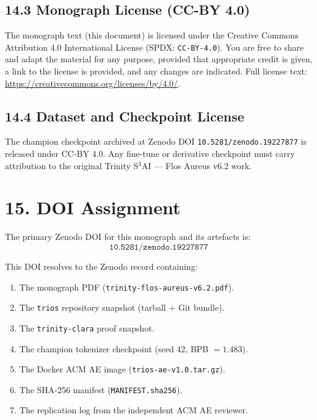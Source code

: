 \subsection{14.3 Monograph License (CC-BY 4.0)}\label{sec:monograph-license}

The monograph text (this document) is licensed under the Creative Commons
Attribution 4.0 International License (SPDX: \texttt{CC-BY-4.0}).
You are free to share and adapt the material for any purpose, provided
that appropriate credit is given, a link to the license is provided, and
any changes are indicated.  Full license text:
\url{https://creativecommons.org/licenses/by/4.0/}.

\subsection{14.4 Dataset and Checkpoint License}\label{sec:data-license}

The champion checkpoint archived at Zenodo DOI
\texttt{10.5281/zenodo.19227877} is released under CC-BY 4.0.  Any
fine-tune or derivative checkpoint must carry attribution to the original
Trinity S${}^3$AI — Flos Aureus v6.2 work.


\section{15. DOI Assignment}\label{sec:doi}

The primary Zenodo DOI for this monograph and its artefacts is:
\[
  \texttt{10.5281/zenodo.19227877}
\]

This DOI resolves to the Zenodo record containing:

\begin{enumerate}
\item The monograph PDF (\texttt{trinity-flos-aureus-v6.2.pdf}).
\item The \texttt{trios} repository snapshot (tarball + Git bundle).
\item The \texttt{trinity-clara} proof snapshot.
\item The champion tokenizer checkpoint (seed 42, BPB $= 1.483$).
\item The Docker ACM AE image (\texttt{trios-ae-v1.0.tar.gz}).
\item The SHA-256 manifest (\texttt{MANIFEST.sha256}).
\item The replication log from the independent ACM AE reviewer.
\end{enumerate}

